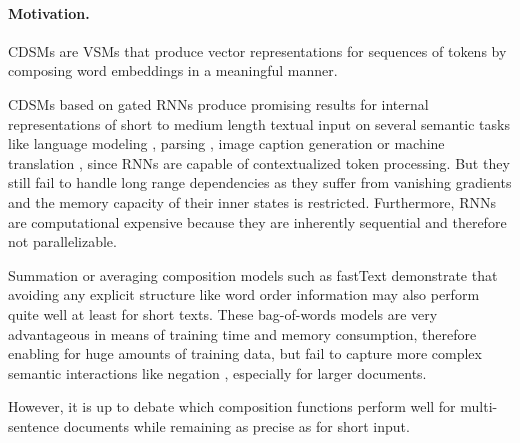 \paragraph{Motivation.}\acfp{CDSM}\autocite{clark_compositional_2008,grefenstette_experimental_2011} are \acp{VSM} \autocite{salton_vector_1975} that produce vector representations for sequences of tokens by composing word embeddings in a meaningful manner. 

\acp{CDSM} based on gated \acp{RNN}\autocite{hochreiter_long_1997} produce promising results for internal representations of short to medium length textual input on several semantic tasks like  language modeling \autocite{sundermeyer_lstm_2012}, parsing \autocite{dyer_recurrent_2016}, image caption generation %
\autocite{vinyals_show_2014} or machine translation \autocite{wu_googles_2016}%
, since \acp{RNN} are capable of contextualized token processing. But they still fail to handle long range dependencies as they suffer from vanishing gradients and the memory capacity of their inner states is restricted. %
Furthermore, \acp{RNN} are computational expensive because they are inherently sequential and therefore not parallelizable. 

Summation or averaging composition models such as fastText \autocite{joulin_bag_2017} demonstrate that avoiding any explicit structure like word order information %
may also perform quite well at least for short texts. These bag-of-words models are very advantageous in means of training time and memory consumption, therefore enabling for huge amounts of training data, but fail to capture more complex semantic interactions like negation%
, especially for larger documents. 

However, it is up to debate which composition functions perform well for multi-sentence documents while remaining as precise as for short input.%

